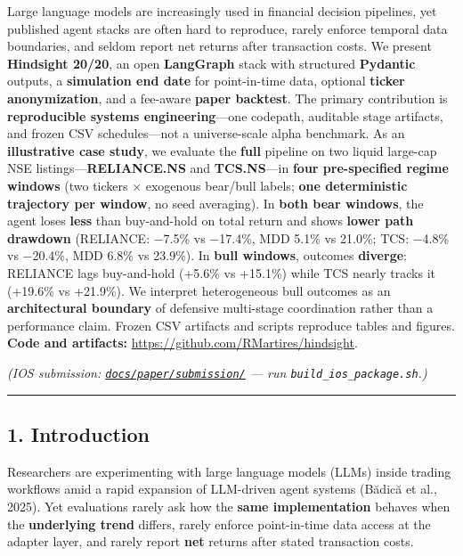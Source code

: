 \documentclass[
]{article}
\begin{document}
Large language models are increasingly used in financial decision
pipelines, yet published agent stacks are often hard to reproduce,
rarely enforce temporal data boundaries, and seldom report net returns
after transaction costs. We present \textbf{Hindsight 20/20}, an open
\textbf{LangGraph} stack with structured \textbf{Pydantic} outputs, a
\textbf{simulation end date} for point-in-time data, optional
\textbf{ticker anonymization}, and a fee-aware \textbf{paper backtest}.
The primary contribution is \textbf{reproducible systems
engineering}---one codepath, auditable stage artifacts, and frozen CSV
schedules---not a universe-scale alpha benchmark. As an
\textbf{illustrative case study}, we evaluate the \textbf{full} pipeline
on two liquid large-cap NSE listings---\textbf{RELIANCE.NS} and
\textbf{TCS.NS}---in \textbf{four pre-specified regime windows} (two
tickers × exogenous bear/bull labels; \textbf{one deterministic
trajectory per window}, no seed averaging). In \textbf{both bear
windows}, the agent loses \textbf{less} than buy-and-hold on total
return and shows \textbf{lower path drawdown} (RELIANCE: −7.5\% vs
−17.4\%, MDD 5.1\% vs 21.0\%; TCS: −4.8\% vs −20.4\%, MDD 6.8\% vs
23.9\%). In \textbf{bull windows}, outcomes \textbf{diverge}: RELIANCE
lags buy-and-hold (+5.6\% vs +15.1\%) while TCS nearly tracks it
(+19.6\% vs +21.9\%). We interpret heterogeneous bull outcomes as an
\textbf{architectural boundary} of defensive multi-stage coordination
rather than a performance claim. Frozen CSV artifacts and scripts
reproduce tables and figures. \textbf{Code and artifacts:}
\url{https://github.com/RMartires/hindsight}.

\emph{(IOS submission:
\href{submission/}{\texttt{docs/paper/submission/}} --- run
\texttt{build\_ios\_package.sh}.)}

\begin{center}\rule{0.5\linewidth}{0.5pt}\end{center}

\subsection{1. Introduction}\label{introduction}

Researchers are experimenting with large language models (LLMs) inside
trading workflows amid a rapid expansion of LLM-driven agent systems
(Bădică et al., 2025). Yet evaluations rarely ask how the \textbf{same
implementation} behaves when the \textbf{underlying trend} differs,
rarely enforce point-in-time data access at the adapter layer, and
rarely report \textbf{net} returns after stated transaction costs.
\end{document}
